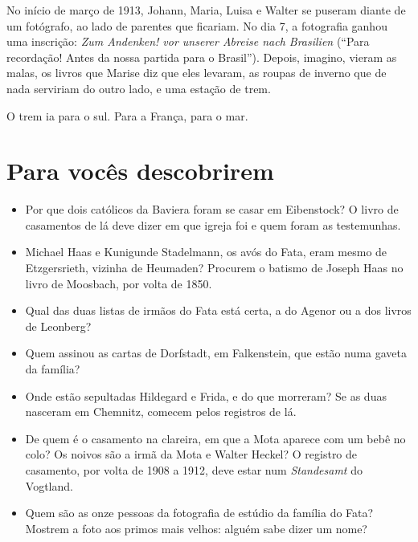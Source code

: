\documentclass[
  brazilian,
  11pt,
  openany]{book}
\providecommand{\tightlist}{%
  \setlength{\itemsep}{0pt}\setlength{\parskip}{0pt}}
\begin{document}
No início de março de 1913, Johann, Maria, Luisa e Walter se puseram
diante de um fotógrafo, ao lado de parentes que ficariam. No dia 7, a
fotografia ganhou uma inscrição: \emph{Zum Andenken! vor unserer Abreise
nach Brasilien} (``Para recordação! Antes da nossa partida para o
Brasil''). Depois, imagino, vieram as malas, os livros que Marise diz
que eles levaram, as roupas de inverno que de nada serviriam do outro
lado, e uma estação de trem.

O trem ia para o sul. Para a França, para o mar.

\section{Para vocês descobrirem}\label{para-vocuxeas-descobrirem-3}

\begin{itemize}
\tightlist
\item
  Por que dois católicos da Baviera foram se casar em Eibenstock? O
  livro de casamentos de lá deve dizer em que igreja foi e quem foram as
  testemunhas.
\item
  Michael Haas e Kunigunde Stadelmann, os avós do Fata, eram mesmo de
  Etzgersrieth, vizinha de Heumaden? Procurem o batismo de Joseph Haas
  no livro de Moosbach, por volta de 1850.
\item
  Qual das duas listas de irmãos do Fata está certa, a do Agenor ou a
  dos livros de Leonberg?
\item
  Quem assinou as cartas de Dorfstadt, em Falkenstein, que estão numa
  gaveta da família?
\item
  Onde estão sepultadas Hildegard e Frida, e do que morreram? Se as duas
  nasceram em Chemnitz, comecem pelos registros de lá.
\item
  De quem é o casamento na clareira, em que a Mota aparece com um bebê
  no colo? Os noivos são a irmã da Mota e Walter Heckel? O registro de
  casamento, por volta de 1908 a 1912, deve estar num \emph{Standesamt}
  do Vogtland.
\item
  Quem são as onze pessoas da fotografia de estúdio da família do Fata?
  Mostrem a foto aos primos mais velhos: alguém sabe dizer um nome?
\end{itemize}
\end{document}

